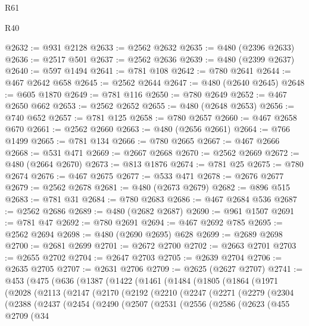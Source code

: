 \begin{lexlean}{R61}
\begin{lexlean}{R40}
\begin{coremodule}
{{{{{{{{{{{{{{{{{{{{{{{{{{{{{{{{{{{{{{{{{{{{{{{{{{{{{{{{{{{{{{{{{{{{{{{{{{{{{{{{{{{{{{{{{{{{{{{{{{{{{{{{{{{{{@2632 := @931 @2128
@2633 := @2562 @2632
@2635 := @480 (@2396 @2633)
@2636 := @2517 @501
@2637 := @2562 @2636
@2639 := @480 (@2399 @2637)
@2640 := @597 @1494
@2641 := @781 @108
@2642 := @780 @2641
@2644 := @467 @2642 @658
@2645 := @2562 @2644
@2647 := @480 (@2640 @2645)
@2648 := @605 @1870
@2649 := @781 @116
@2650 := @780 @2649
@2652 := @467 @2650 @662
@2653 := @2562 @2652
@2655 := @480 (@2648 @2653)
@2656 := @740 @652
@2657 := @781 @125
@2658 := @780 @2657
@2660 := @467 @2658 @670
@2661 := @2562 @2660
@2663 := @480 (@2656 @2661)
@2664 := @766 @1499
@2665 := @781 @134
@2666 := @780 @2665
@2667 := @467 @2666
@2668 := @531 @471
@2669 := @2667 @2668
@2670 := @2562 @2669
@2672 := @480 (@2664 @2670)
@2673 := @813 @1876
@2674 := @781 @25
@2675 := @780 @2674
@2676 := @467 @2675
@2677 := @533 @471
@2678 := @2676 @2677
@2679 := @2562 @2678
@2681 := @480 (@2673 @2679)
@2682 := @896 @515
@2683 := @781 @31
@2684 := @780 @2683
@2686 := @467 @2684 @536
@2687 := @2562 @2686
@2689 := @480 (@2682 @2687)
@2690 := @961 @1507
@2691 := @781 @47
@2692 := @780 @2691
@2694 := @467 @2692 @785
@2695 := @2562 @2694
@2698 := @480 (@2690 @2695) @628
@2699 := @2689 @2698
@2700 := @2681 @2699
@2701 := @2672 @2700
@2702 := @2663 @2701
@2703 := @2655 @2702
@2704 := @2647 @2703
@2705 := @2639 @2704
@2706 := @2635 @2705
@2707 := @2631 @2706
@2709 := @2625 (@2627 @2707)
@2741 := @453
    (@475
      (@636
        (@1387
          (@1422
            (@1461
              (@1484
                (@1805
                  (@1864
                    (@1971
                      (@2028
                        (@2113
                          (@2147
                            (@2170
                              (@2192
                                (@2210
                                  (@2247
                                    (@2271
                                      (@2279
                                        (@2304
                                          (@2388
                                            (@2437
                                              (@2454
                                                (@2490
                                                  (@2507
                                                    (@2531
                                                      (@2556
                                                        (@2586
                                                          (@2623
                                                            (@455
                                                              @2709
                                                              (@34
}}}}}}}}}}}}}}}}}}}}}}}}}}}}}}}}}}}}}}}}}}}}}}}}}}}}}}}}}}}}}}}}}}}}}}}}}}}}}}}}}}}}}}}}}}}}}}}}}}}}}}}}}}}}}
\end{coremodule}
\end{lexlean}
\end{lexlean}
